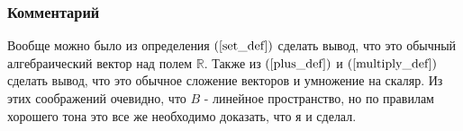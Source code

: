 \subsubsection*{Комментарий}
Вообще можно было из определения $(\ref{set_def})$ сделать вывод, что это обычный алгебраический вектор над полем $\mathbb{R}$. Также из $(\ref{plus_def})$ и $(\ref{multiply_def})$ сделать вывод, что это обычное сложение векторов и умножение на скаляр. Из этих соображений очевидно, что $B$ - линейное пространство, но по правилам хорошего тона это все же необходимо доказать, что я и сделал.